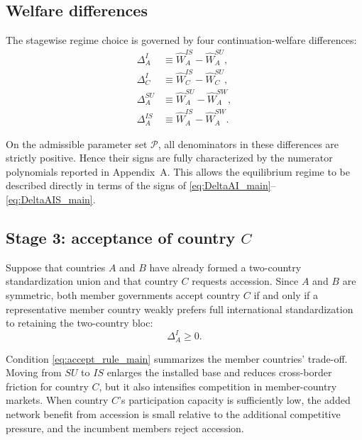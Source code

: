 \subsection{Welfare differences}

The stagewise regime choice is governed by four continuation-welfare differences:
\begin{align}
\Delta_A^I
&\equiv
\widehat W_A^{IS}-\widehat W_A^{SU}, \label{eq:DeltaAI_main}\\
\Delta_C^I
&\equiv
\widehat W_C^{IS}-\widehat W_C^{SU}, \label{eq:DeltaCI_main}\\
\Delta_A^{SU}
&\equiv
\widehat W_A^{SU}-\widehat W_A^{SW}, \label{eq:DeltaASU_main}\\
\Delta_A^{IS}
&\equiv
\widehat W_A^{IS}-\widehat W_A^{SW}. \label{eq:DeltaAIS_main}
\end{align}

On the admissible parameter set $\mathcal P$, all denominators in these differences are strictly positive. Hence their signs are fully characterized by the numerator polynomials reported in Appendix~A. This allows the equilibrium regime to be described directly in terms of the signs of \eqref{eq:DeltaAI_main}--\eqref{eq:DeltaAIS_main}.

\subsection{Stage 3: acceptance of country \texorpdfstring{$C$}{C}}

Suppose that countries $A$ and $B$ have already formed a two-country standardization union and that country $C$ requests accession. Since $A$ and $B$ are symmetric, both member governments accept country $C$ if and only if a representative member country weakly prefers full international standardization to retaining the two-country bloc:
\begin{equation}
\Delta_A^I \ge 0.
\label{eq:accept_rule_main}
\end{equation}

Condition \eqref{eq:accept_rule_main} summarizes the member countries' trade-off. Moving from $SU$ to $IS$ enlarges the installed base and reduces cross-border friction for country $C$, but it also intensifies competition in member-country markets. When country $C$'s participation capacity is sufficiently low, the added network benefit from accession is small relative to the additional competitive pressure, and the incumbent members reject accession.

